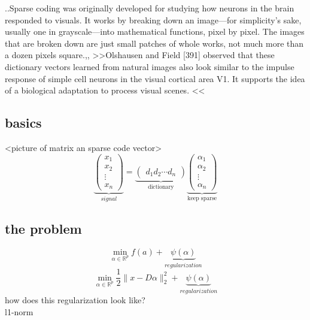 \begin{frame}
..Sparse coding was originally developed for studying how neurons in the brain responded to visuals. It works by breaking down an image—for simplicity's sake, usually one in grayscale—into mathematical functions, pixel by pixel. The images that are broken down are just small patches of whole works, not much more than a dozen pixels square.,,
>>Olshausen and Field [391] observed that these
dictionary vectors learned from natural images also look similar to the impulse
response of simple cell neurons in the visual cortical area V1. It supports the idea
of a biological adaptation to process visual scenes. <<
\end{frame}

\subsection{basics}
\begin{frame}
<picture of matrix an sparse code vector>
\[
\underbrace{\begin{pmatrix} x_1 \\ x_2 \\ \vdots \\ x_n \end{pmatrix}}_{signal} =\underbrace{\begin{pmatrix} d_1  d_2 \cdots d_n \end{pmatrix}}_{\textrm{dictionary}}
\underbrace{\begin{pmatrix} \alpha_1 \\ \alpha_2 \\ \vdots \\ \alpha_n \end{pmatrix}}_{\textrm{keep sparse}}
\]
\end{frame}

\subsection{the problem}
\begin{frame}
\[ 
\min_{\alpha\in\mathbb{R}^{p}} f(a) + \underbrace{\psi(\alpha)}_{regularization} 
\]
\[
\min_{\alpha\in\mathbb{R}^{p}} \frac{1}{2} \lVert x - D\alpha \rVert^{2}_{2} + \underbrace{\psi(\alpha)}_{regularization}
\] 
how does this regularization look like? \\
l1-norm

\end{frame}


